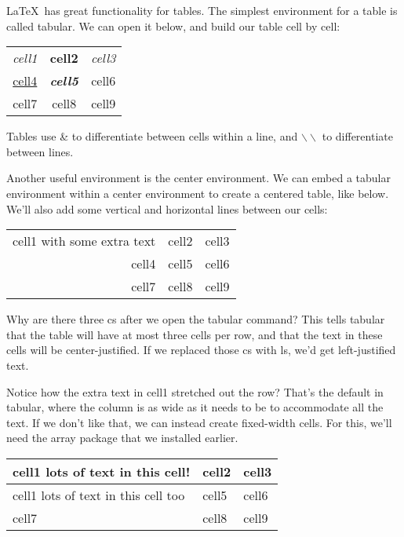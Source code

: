 \documentclass{article}
\begin{document}
\LaTeX\ has great functionality for tables. The simplest environment for a table is called tabular. We can open it below, and build our table cell by cell:

\begin{tabular}{ c c c }
	\emph{cell1} & \textbf{cell2} & \textit{cell3} \\ 
	\underline{cell4} & \textbf{\textit{cell5}} & cell6 \\  
	cell7 & cell8 & cell9    
\end{tabular}

Tables use \& to differentiate between cells within a line, and $\backslash\backslash$ to differentiate between lines.

Another useful environment is the center environment. We can embed a tabular environment within a center environment to create a centered table, like below. We'll also add some vertical and horizontal lines between our cells:

\begin{center}
	\begin{tabular}{|r|c|c|} 
		\hline
		cell1 with some extra text & cell2 & cell3 \\ 
		cell4 & cell5 & cell6 \\ 
		cell7 & cell8 & cell9 \\ 
		\hline
	\end{tabular}
\end{center}

Why are there three cs after we open the tabular command? This tells tabular that the table will have at most three cells per row, and that the text in these cells will be center-justified. If we replaced those cs with ls, we'd get left-justified text.

Notice how the extra text in cell1 stretched out the row? That's the default in tabular, where the column is as wide as it needs to be to accommodate all the text. If we don't like that, we can instead create fixed-width cells. For this, we'll need the array package that we installed earlier.

\begin{center}
	\begin{tabular}{ | m{3cm} | m{1cm}| m{1cm} | } 
		\hline
		cell1 lots of text in this cell! & cell2 & cell3 \\ 
		\hline
		cell1 lots of text in this cell too & cell5 & cell6 \\ 
		\hline
		cell7 & cell8 & cell9 \\ 
		\hline
	\end{tabular}
\end{center}
\end{document}
